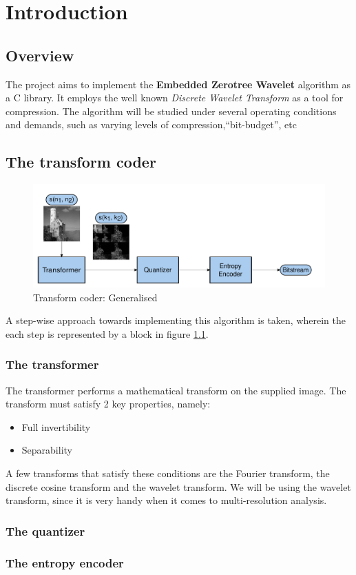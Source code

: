 \documentclass[./A14_Report.tex]{subfiles}
\begin{document}
\chapter{Introduction}
\section{Overview}
The project aims to implement the \textbf{Embedded Zerotree Wavelet} algorithm
as a C library. It employs the well known \textit{Discrete Wavelet Transform}
as a tool for compression. The algorithm will be studied under several
operating conditions and demands, such as varying levels of
compression,``bit-budget'', etc

\section{The transform coder}

\begin{figure}[h]
    \centering
    \includegraphics[scale=0.5]{../img/block-diag_shrunk.pdf}
    \caption{Transform coder: Generalised \cite{shap1993}}
    \label{fig:tcoder}
\end{figure}

A step-wise approach towards implementing this algorithm is taken, wherein
the each step is represented by a block in figure \ref{fig:tcoder}.

\pagebreak

\subsection{The transformer}
The transformer performs a mathematical transform on the supplied image. The
transform must satisfy 2 key properties, namely:
\begin{itemize}
    \item Full invertibility
    \item Separability
\end{itemize}

A few transforms that satisfy these conditions are the Fourier transform, the
discrete cosine transform and the wavelet transform. We will be using the
wavelet transform, since it is very handy when it comes to multi-resolution
analysis.

\subsection{The quantizer}

\subsection{The entropy encoder}
\end{document}
